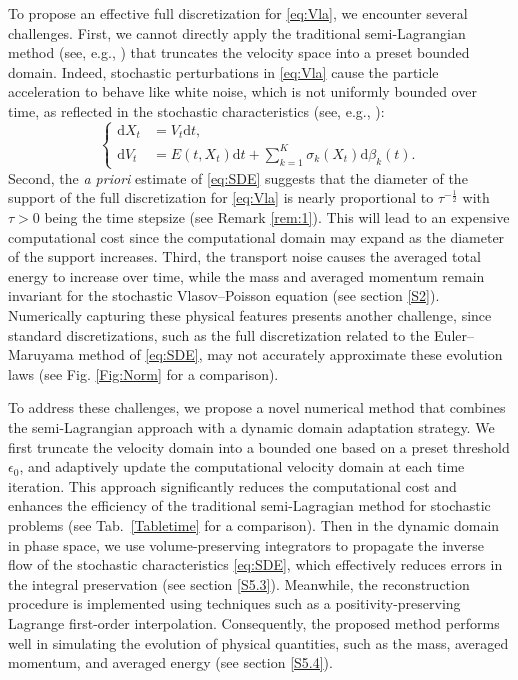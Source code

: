 \documentclass[11pt,reqno]{amsproc}
\newcommand{\ud}{\mathrm d}
\numberwithin{equation}{section}
\begin{document}
To propose an effective full discretization for \eqref{eq:Vla}, we encounter several challenges. 
First, we cannot directly apply  the traditional semi-Lagrangian method (see, e.g., \cite{BN04, EO14}) that truncates the velocity space into a preset bounded domain.
Indeed, stochastic perturbations in \eqref{eq:Vla}
cause the
particle acceleration to behave like white noise, which is not uniformly bounded over time, as reflected in the stochastic characteristics (see, e.g., \cite{KH19}):
\begin{equation}\label{eq:SDE}
\left\{
\begin{split}
\ud X_t&=V_t \ud t,\\
\ud V_t&=E(t,X_t) \ud t+\sum_{k=1}^K\sigma_k(X_t)\ud \beta_k(t).
\end{split}
\right.
\end{equation}
Second, 
the \emph{a 
priori} estimate of \eqref{eq:SDE} suggests that the diameter of the support of the full discretization
 for \eqref{eq:Vla} 
 is nearly proportional to $\tau^{-\frac12}$ with $\tau>0$ being the time stepsize (see Remark \ref{rem:1}). This will lead to 
an expensive computational cost 
since the
 computational domain may expand as the diameter of the support increases.
 Third,
the transport noise 
causes the averaged total energy to increase over time, while the mass and averaged momentum remain invariant for the stochastic Vlasov--Poisson equation (see section \ref{S2}). Numerically
capturing these physical features presents another challenge, since standard discretizations, 
such as the full discretization related to the Euler--Maruyama method of  \eqref{eq:SDE},
 may not accurately approximate these evolution laws ({see Fig. \ref{Fig:Norm} for a comparison)}.



To address these challenges, we propose a novel numerical method that combines the semi-Lagrangian approach with a dynamic domain adaptation strategy.  
We first truncate the velocity domain into a bounded one based on a preset threshold $\epsilon_0$, and adaptively update the computational velocity domain at each time iteration.
This approach significantly reduces the computational cost and enhances the efficiency of the traditional semi-Lagragian method for stochastic problems (see Tab.\ \ref{Tabletime} for a comparison). 
Then in the dynamic domain in phase space, we  use volume-preserving integrators to propagate the inverse flow of the stochastic characteristics \eqref{eq:SDE},
which effectively reduces errors in the integral preservation (see section \ref{S5.3}). Meanwhile, the reconstruction procedure is  implemented using techniques such as a positivity-preserving Lagrange first-order interpolation. Consequently, the proposed method performs well in simulating the evolution of physical quantities, such as the mass, averaged momentum, and averaged energy (see section \ref{S5.4}).
\end{document}
